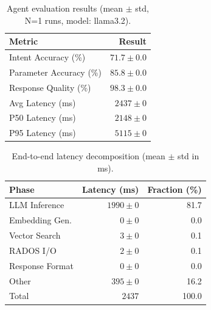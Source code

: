 
\begin{table}[t]
\centering
\caption{Agent evaluation results (mean $\pm$ std, N=1 runs, model: llama3.2).}
\label{tab:eval-results}
\begin{tabular}{lr}
\toprule
\textbf{Metric} & \textbf{Result} \\
\midrule
Intent Accuracy (\%) & $71.7 \pm 0.0$ \\
Parameter Accuracy (\%) & $85.8 \pm 0.0$ \\
Response Quality (\%) & $98.3 \pm 0.0$ \\
\midrule
Avg Latency (ms) & $2437 \pm 0$ \\
P50 Latency (ms) & $2148 \pm 0$ \\
P95 Latency (ms) & $5115 \pm 0$ \\
\bottomrule
\end{tabular}
\end{table}


\begin{table}[t]
\centering
\caption{End-to-end latency decomposition (mean $\pm$ std in ms).}
\label{tab:latency-decomp}
\begin{tabular}{lrr}
\toprule
\textbf{Phase} & \textbf{Latency (ms)} & \textbf{Fraction (\%)} \\
\midrule
LLM Inference & $1990 \pm 0$ & 81.7 \\
Embedding Gen. & $0 \pm 0$ & 0.0 \\
Vector Search & $3 \pm 0$ & 0.1 \\
RADOS I/O & $2 \pm 0$ & 0.1 \\
Response Format & $0 \pm 0$ & 0.0 \\
Other & $395 \pm 0$ & 16.2 \\
\midrule
Total & $2437$ & 100.0 \\
\bottomrule
\end{tabular}
\end{table}
